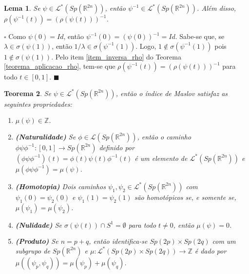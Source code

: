\documentclass[12pt]{book}
\newtheorem{teorema}{Teorema}[section]
\newtheorem{lema}[teorema]{Lema}
\newenvironment{prova}[1]{$\square$ #1}{\hfill$\blacksquare$}
\newcommand{\caminhosespeciais}[1]{\mathcal{L}^{*}(#1)}
\newcommand{\caminhos}{\mathcal{L}}
\newcommand{\caminhossempontobase}[1]{\caminhos(#1)}
\newcommand{\circulo}{S^{1}}
\newcommand{\dominioMaslov}{\caminhos^{*}(\gruposimpletico{\real{2n}})}
\newcommand{\espectrooperador}[1]{\sigma(#1)}
\newcommand{\gruposimpletico}[1]{Sp(#1)}
\newcommand{\inteiros}{\mathbb{Z}}
\newcommand{\intervalo}{[0,1]}
\newcommand{\real}[1]{\mathbb{R}^{#1}}
\begin{document}
	\begin{lema}\label{lema_inversa_caminho_especial}
		Se $\psi \in   \dominioMaslov$, então $\psi^{-1} \in  \dominioMaslov$. Além disso, $\rho(\psi^{-1}(t)) = (\rho(\psi(t)))^{-1}$.
	\end{lema}
	\begin{prova}
		Como $\psi(0) = Id$, então $\psi^{-1}(0) = (\psi(0))^{-1} = Id$. Sabe-se que, se $\lambda\in \espectrooperador{\psi(1)}$, então $1/\lambda\in \espectrooperador{\psi^{-1}(1)}$. Logo, $1\notin \espectrooperador{\psi^{-1}(1)}$ pois $1\notin \espectrooperador{\psi(1)}$. Pelo item \ref{item_inversa_rho} do Teorema \ref{teorema_aplicacao_rho}, tem-se que $\rho(\psi^{-1}(t))= (\rho(\psi(t)))^{-1}$ para todo $t\in \intervalo$.
	\end{prova}
	
	
	\begin{teorema}\label{teorema_indice_maslov}
		Se $\psi \in \dominioMaslov$, então o índice de Maslov satisfaz as seguintes propriedades:
		\begin{enumerate}
			\item $\mu(\psi) \in \inteiros$.
			
			\item \textbf{(Naturalidade)}\label{item_naturalidade_maslov} Se $\phi\in \caminhossempontobase{\gruposimpletico{\real{2n}}}$, então o caminho $\phi\psi\phi^{-1}: \intervalo \to \gruposimpletico{\real{2n}}$ definido por $(\phi\psi\phi^{-1})(t) = \phi(t)\psi(t)\phi^{-1}(t)$ é um elemento de $\caminhosespeciais{\gruposimpletico{\real{2n}}}$ e $\mu(\phi\psi\phi^{-1}) = \mu(\psi)$.
			
			\item \textbf{(Homotopia)} \label{item_homotopia_caminhos_teorema_indice_maslov} Dois caminhos $\psi_{1}, \psi_{2}\in \dominioMaslov $ com $\psi_{1}(0) = \psi_{2}(0)$ e $\psi_{1}(1) = \psi_{2}(1)$ são homotópicos se, e somente se, $\mu(\psi_{1}) = \mu(\psi_{2})$.
			
			\item \textbf{(Nulidade)} Se $\espectrooperador{\psi(t)}\cap \circulo = \emptyset$ para todo $t\neq 0$, então $\mu(\psi) = 0$.
			
			\item \textbf{(Produto)} Se $n=p+q$, então identifica-se $\gruposimpletico{2p}\times \gruposimpletico{2q}$ com um subgrupo de $\gruposimpletico{\real{2n}}$ e $\mu:\caminhosespeciais{\gruposimpletico{2p}\times \gruposimpletico{2q}} \to \inteiros$ é dado por $\mu((\psi_{p}, \psi_{q})) = \mu(\psi_{p})+\mu(\psi_{q})$.
			

\end{enumerate}
\end{teorema}
\end{document}
